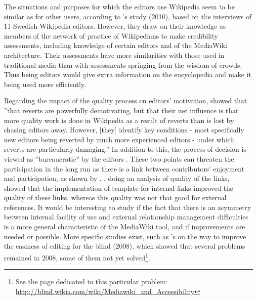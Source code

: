 The situations and purposes for which the editors use Wikipedia seem
to be similar as for other users, according to \citeauthor{FranckeSundin10}'s
study (2010), based on the interviews of 11 Swedish Wikipedia editors.
However, they draw on their knowledge as members of the network of
practice of Wikipedians to make credibility assessments, including
knowledge of certain editors and of the MediaWiki architecture. Their
assessments have more similarities with those used in traditional
media than with assessments springing from the wisdom of crowds. Thus
being editors would give extra information on the encyclopedia and
make it being used more efficiently.

Regarding the impact of the quality process on editors' motivation,
\citet{HalfakerKitturRiedl11} showed that ''that reverts are powerfully
demotivating, but that their net influence is that more quality work
is done in Wikipedia as a result of reverts than is lost by chasing
editors away. However, {[}they{]} identify key conditions - most specifically
new editors being reverted by much more experienced editors - under
which reverts are particularly damaging.'' In addition to this, the
process of decision is viewed as ''bureaucratic'' by the editors
\citep{MullerSeitzReger10}. These two points can threaten the participation
in the long run as there is a link between contributors' enjoyment
and participation, as shown by \citet{Amichai-Hamburgeretal08}. \citet{LopesCarrico08},
doing an analysis of quality of the links, showed that the implementation
of template for internal links improved the quality of these links,
whereas this quality was not that good for external references. It
would be interesting to study if the fact that there is an asymmetry
between internal facility of use and external relationship management
difficulties is a more general characteristic of the MediaWiki tool,
and if improvements are needed or possible. More specific studies
exist, such as \citeauthor{Buzzietal08}'s on the way to improve the
easiness of editing for the blind (2008), which showed that several
problems remained in 2008, some of them not yet solved\footnote{See the page dedicated to this particular problem: \url{http://blind.wikia.com/wiki/Mediawiki_and_Accessibility}}.